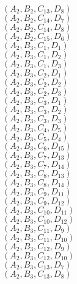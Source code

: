 \documentclass[14pt]{article}
\begin{document}
    $({A}_{2}, {B}_{2}, {C}_{13}, {D}_{8}) $ \\ 
    $({A}_{2}, {B}_{2}, {C}_{14}, {D}_{7}) $ \\ 
    $({A}_{2}, {B}_{2}, {C}_{14}, {D}_{8}) $ \\ 
    $({A}_{2}, {B}_{2}, {C}_{15}, {D}_{6}) $ \\ 
    $({A}_{2}, {B}_{3}, {C}_{1}, {D}_{1}) $ \\ 
    $({A}_{2}, {B}_{3}, {C}_{1}, {D}_{2}) $ \\ 
    $({A}_{2}, {B}_{3}, {C}_{1}, {D}_{3}) $ \\ 
    $({A}_{2}, {B}_{3}, {C}_{2}, {D}_{1}) $ \\ 
    $({A}_{2}, {B}_{3}, {C}_{2}, {D}_{2}) $ \\ 
    $({A}_{2}, {B}_{3}, {C}_{2}, {D}_{3}) $ \\ 
    $({A}_{2}, {B}_{3}, {C}_{3}, {D}_{1}) $ \\ 
    $({A}_{2}, {B}_{3}, {C}_{3}, {D}_{2}) $ \\ 
    $({A}_{2}, {B}_{3}, {C}_{3}, {D}_{3}) $ \\ 
    $({A}_{2}, {B}_{3}, {C}_{4}, {D}_{5}) $ \\ 
    $({A}_{2}, {B}_{3}, {C}_{5}, {D}_{4}) $ \\ 
    $({A}_{2}, {B}_{3}, {C}_{6}, {D}_{15}) $ \\ 
    $({A}_{2}, {B}_{3}, {C}_{7}, {D}_{13}) $ \\ 
    $({A}_{2}, {B}_{3}, {C}_{7}, {D}_{14}) $ \\ 
    $({A}_{2}, {B}_{3}, {C}_{8}, {D}_{13}) $ \\ 
    $({A}_{2}, {B}_{3}, {C}_{8}, {D}_{14}) $ \\ 
    $({A}_{2}, {B}_{3}, {C}_{9}, {D}_{11}) $ \\ 
    $({A}_{2}, {B}_{3}, {C}_{9}, {D}_{12}) $ \\ 
    $({A}_{2}, {B}_{3}, {C}_{10}, {D}_{11}) $ \\ 
    $({A}_{2}, {B}_{3}, {C}_{10}, {D}_{12}) $ \\ 
    $({A}_{2}, {B}_{3}, {C}_{11}, {D}_{9}) $ \\ 
    $({A}_{2}, {B}_{3}, {C}_{11}, {D}_{10}) $ \\ 
    $({A}_{2}, {B}_{3}, {C}_{12}, {D}_{9}) $ \\ 
    $({A}_{2}, {B}_{3}, {C}_{12}, {D}_{10}) $ \\ 
    $({A}_{2}, {B}_{3}, {C}_{13}, {D}_{7}) $ \\ 
    $({A}_{2}, {B}_{3}, {C}_{13}, {D}_{8}) $ \\ 
\end{document}
